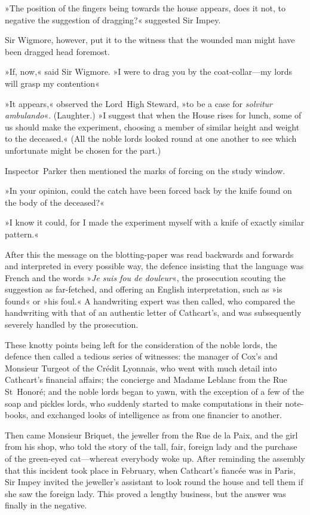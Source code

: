 »The position of the fingers being towards the house appears, does it not, to negative the suggestion of dragging?« suggested Sir Impey.

Sir Wigmore, however, put it to the witness that the wounded man might have been dragged head foremost.

»If, now,« said Sir Wigmore. »I were to drag you by the coat-collar—my lords will grasp my contention\longdash«

»It appears,« observed the Lord~High Steward, »to be a case for \textit{solvitur ambulando}«. (Laughter.) »I suggest that when the House rises for lunch, some of us should make the experiment, choosing a member of similar height and weight to the deceased.« (All the noble lords looked round at one another to see which unfortunate might be chosen for the part.)

Inspector~Parker then mentioned the marks of forcing on the study window.

»In your opinion, could the catch have been forced back by the knife found on the body of the deceased?«

»I know it could, for I made the experiment myself with a knife of exactly similar pattern.«

After this the message on the blotting-paper was read backwards and forwards and interpreted in every possible way, the defence insisting that the language was French and the words »\textit{Je suis fou de douleur}«, the prosecution scouting the suggestion as far-fetched, and offering an English interpretation, such as »is found« or »his foul.« A handwriting expert was then called, who compared the handwriting with that of an authentic letter of Cathcart's, and was subsequently severely handled by the prosecution.

These knotty points being left for the consideration of the noble lords, the defence then called a tedious series of witnesses: the manager of Cox's and Monsieur Turgeot of the Crédit Lyonnais, who went with much detail into Cathcart's financial affairs; the concierge and Madame Leblanc from the Rue St~Honoré; and the noble lords began to yawn, with the exception of a few of the soap and pickles lords, who suddenly started to make computations in their note-books, and exchanged looks of intelligence as from one financier to another.

Then came Monsieur Briquet, the jeweller from the Rue de la Paix, and the girl from his shop, who told the story of the tall, fair, foreign lady and the purchase of the green-eyed cat—whereat everybody woke up.  After reminding the assembly that this incident took place in February, when Cathcart's fiancée was in Paris, Sir Impey invited the jeweller's assistant to look round the house and tell them if she saw the foreign lady. This proved a lengthy business, but the answer was finally in the negative.

